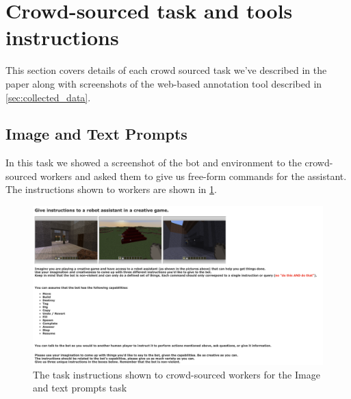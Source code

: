 \section{Crowd-sourced task and tools instructions}
\label{sec:instructions}
This section covers details of each crowd sourced task we've described in the paper along with screenshots of the web-based annotation tool described in \ref{sec:collected_data}.

\subsection{Image and Text Prompts}
\label{sec:freegen_instructions}
In this task we showed a screenshot of the bot and environment to the crowd-sourced workers and asked them to give us free-form commands for the assistant.
The instructions shown to workers are shown in \ref{fig:freegen}.
\begin{figure}
	\includegraphics[width=\linewidth ]{figures/freegen.jpg}
	\caption{The task instructions shown to crowd-sourced workers for the Image and text prompts task\label{fig:freegen}}
\end{figure}

